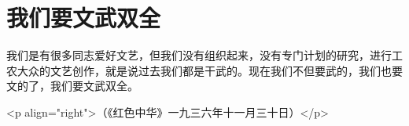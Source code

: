 \section[我们要文武双全（一九三六年十一月）]{我们要文武双全}


我们是有很多同志爱好文艺，但我们没有组织起来，没有专门计划的研究，进行工农大众的文艺创作，就是说过去我们都是干武的。现在我们不但要武的，我们也要文的了，我们要文武双全。

<p align="right">（《红色中华》一九三六年十一月三十日）</p>

